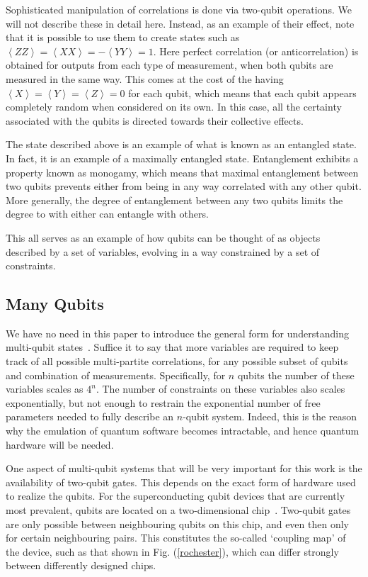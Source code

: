 \documentclass[conference]{IEEEtran}
\begin{document}
Sophisticated manipulation of correlations is done via two-qubit operations. We will not describe these in detail here. Instead, as an example of their effect, note that it is possible to use them to create states such as  $\left\langle ZZ\right\rangle =\left\langle XX\right\rangle =-\left\langle YY\right\rangle = 1$. Here perfect correlation (or anticorrelation) is obtained for outputs from each type of measurement, when both qubits are measured in the same way. This comes at the cost of the having $\left\langle X\right\rangle=\left\langle Y\right\rangle=\left\langle Z\right\rangle =0$ for each qubit, which means that each qubit appears completely random when considered on its own. In this case, all the certainty associated with the qubits is directed towards their collective effects.

The state described above is an example of what is known as an entangled state. In fact, it is an example of a maximally entangled state. Entanglement exhibits a property known as monogamy, which means that maximal entanglement between two qubits prevents either from being in any way correlated with any other qubit. More generally, the degree of entanglement between any two qubits limits the degree to with either can entangle with others.

This all serves as an example of how qubits can be thought of as objects described by a set of variables, evolving in a way constrained by a set of constraints.


\subsection{Many Qubits}

We have no need in this paper to introduce the general form for understanding multi-qubit states~\cite{qiskit-textbook}. Suffice it to say that more variables are required to keep track of all possible multi-partite correlations, for any possible subset of qubits and combination of measurements. Specifically, for $n$ qubits the number of these variables scales as $4^n$. The number of constraints on these variables also scales exponentially, but not enough to restrain the exponential number of free parameters needed to fully describe an $n$-qubit system. Indeed, this is the reason why the emulation of quantum software becomes intractable, and hence quantum hardware will be needed.

One aspect of multi-qubit systems that will be very important for this work is the availability of two-qubit gates. This depends on the exact form of hardware used to realize the qubits. For the superconducting qubit devices that are currently most prevalent, qubits are located on a two-dimensional chip~\cite{murali:19}. Two-qubit gates are only possible between neighbouring qubits on this chip, and even then only for certain neighbouring pairs. This constitutes the so-called `coupling map' of the device, such as that shown in Fig. (\ref{rochester}), which can differ strongly between differently designed chips.
\end{document}
